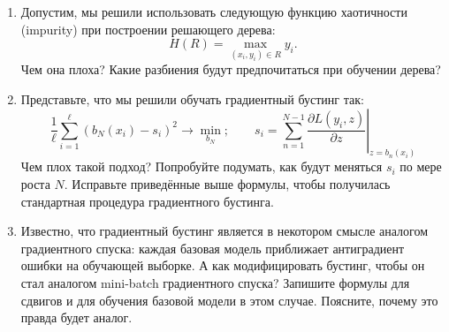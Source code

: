 \documentclass[12pt,a4paper]{article}
\begin{document}
\begin{enumerate}
    \item Допустим, мы решили использовать следующую функцию хаотичности
    (impurity) при построении решающего дерева:
    \[
    H(R) = \max_{(x_i,y_i)\in R} y_i.
    \]
    Чем она плоха? Какие разбиения будут предпочитаться при обучении дерева?

    \item Представьте, что мы решили обучать градиентный бустинг так:
    \[
    \frac{1}{\ell}\sum_{i=1}^{\ell}(b_N(x_i) - s_i)^2 \to \min_{b_N};
    \qquad
    s_i = \sum_{n=1}^{N-1}
    \left.\frac{\partial L(y_i, z)}{\partial z}\right|_{z = b_n(x_i)}
    \]
    Чем плох такой подход? Попробуйте подумать, как будут меняться $s_i$
    по мере роста $N$. Исправьте приведённые выше формулы, чтобы
    получилась стандартная процедура градиентного бустинга.

    \item Известно, что градиентный бустинг является в некотором смысле
    аналогом градиентного спуска: каждая базовая модель приближает
    антиградиент ошибки на обучающей выборке. А как модифицировать
    бустинг, чтобы он стал аналогом mini-batch градиентного спуска?
    Запишите формулы для сдвигов и для обучения базовой модели в этом
    случае. Поясните, почему это правда будет аналог.
\end{enumerate}
\end{document}
